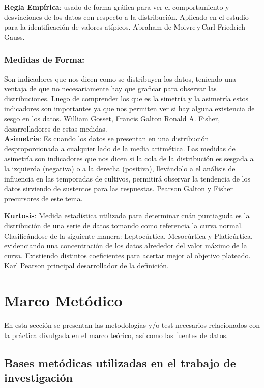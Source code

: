 \documentclass[oneside,11pt]{Latex/Classes/PhDthesisPSnPDF}
\begin{document}
\textbf{Regla Empírica}: usado de forma gráfica para ver el
comportamiento y desviaciones de los datos con respecto a la
distribución. Aplicado en el estudio para la identificación de valores
atípicos. Abraham de Moivre\,y\,Carl Friedrich Gauss.

\subsection{Medidas de Forma:}

Son indicadores que nos dicen como se distribuyen los datos, teniendo
una ventaja de que no necesariamente hay que graficar para observar las
distribuciones. Luego de comprender los que es la simetría y la
asimetría estos indicadores son importantes ya que nos permiten ver si
hay alguna existencia de sesgo en los datos. William Gosset, Francis
Galton Ronald A. Fisher, desarrolladores de estas medidas.\\

\textbf{Asimetría}: Es cuando los datos se presentan en una distribución
desproporcionada a cualquier lado de la media aritmética. Las medidas de
asimetría son indicadores que nos dicen si la cola de la distribución es
sesgada a la izquierda (negativa) o a la derecha (positiva), llevándolo
a el análisis de influencia en las temporadas de cultivos, permitirá
observar la tendencia de los datos sirviendo de sustentos para las
respuestas. Pearson Galton y Fisher precursores de este tema.

\textbf{Kurtosis}: Medida estadística utilizada para determinar cuán
puntiaguda es la distribución de una serie de datos tomando como
referencia la curva normal. Clasificándose de la siguiente manera:
Leptocúrtica, Mesocúrtica y Platicúrtica, evidenciando una concentración
de los datos alrededor del valor máximo de la curva. Existiendo
distintos coeficientes para acertar mejor al objetivo plateado. Karl
Pearson principal desarrollador de la definición.

\chapter{Marco Metódico}

En esta sección se presentan las metodologías y/o test necesarios
relacionados con la práctica divulgada en el marco teórico, así como las
fuentes de datos.

\section{Bases metódicas utilizadas en el trabajo de investigación}
\end{document}
